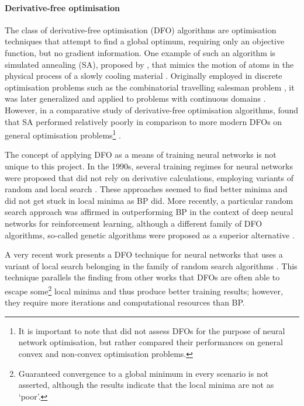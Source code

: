 \paragraph{Derivative-free optimisation}
The class of derivative-free optimisation (DFO) algorithms are optimisation techniques that attempt to find a global optimum, requiring only an objective function, but no gradient information.
One example of such an algorithm is simulated annealing (SA), proposed by \citeauthor{kirkpatrick1983}, that mimics the motion of atoms in the physical process of a slowly cooling material \cite*{kirkpatrick1983}.
Originally employed in discrete optimisation problems such as the combinatorial travelling salesman problem \cite{cerny1985}, it was later generalized and applied to problems with continuous domains \cite{belisle1993}.
However, in a comparative study of derivative-free optimisation algorithms, \citeauthor{rios2009} found that SA performed relatively poorly in comparison to more modern DFOs on general optimisation problems\footnote{It is important to note that \citeauthor{rios2009} did not assess DFOs for the purpose of neural network optimisation, but rather compared their performances on general convex and non-convex optimisation problems.} \cite*{rios2009}.

The concept of applying DFO as a means of training neural networks is not unique to this project.
In the 1990s, several training regimes for neural networks were proposed that did not rely on derivative calculations, employing variants of random and local search \cite{hirasawa1998,battiti1995}.
These approaches seemed to find better minima and did not get stuck in local minima as BP did. 
More recently, a particular random search approach was affirmed in outperforming BP in the context of deep neural networks for reinforcement learning, although a different family of DFO algorithms, so-called genetic algorithms were proposed as a superior alternative \cite{such2017}.

A very recent work presents a DFO technique for neural networks that uses a variant of local search belonging in the family of random search algorithms \cite{aly2019}.
This technique parallels the finding from other works that DFOs are often able to escape some\footnote{Guaranteed convergence to a global minimum in every scenario is not asserted, although the results indicate that the local minima are not as `poor'.} local minima and thus produce better training results; however, they require more iterations and computational resources than BP. 

